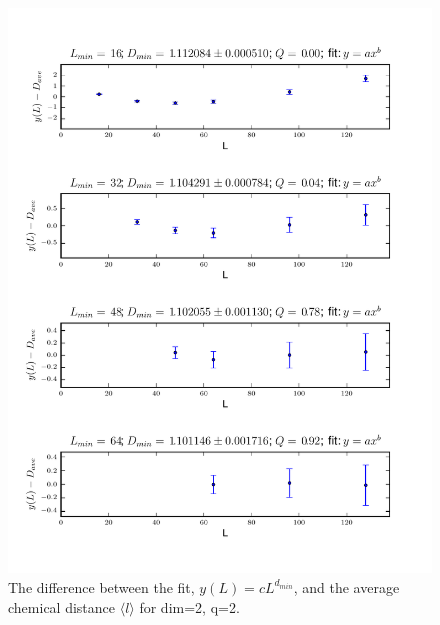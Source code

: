 \documentclass[pre,preprint]{revtex4}
\newcommand{\lb}{{\langle}}
\newcommand{\rb}{{\rangle}}
\begin{document}
\begin{figure}[htp]
\centering
\includegraphics[width=.85\textwidth]{figures/d_min_D2q2_46_fig}
\caption{The difference between the fit, $y(L)=cL^{d_{min}}$, and the average chemical distance $\lb l \rb$ for dim=2, q=2.}\label{fig:3}
\end{figure}

\end{document}
